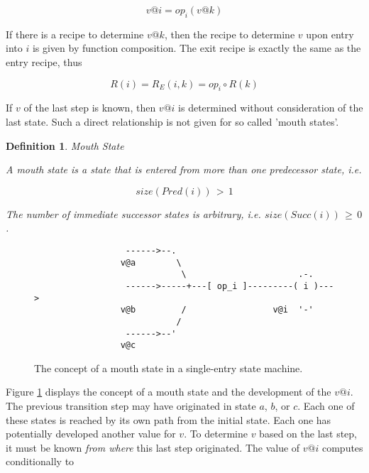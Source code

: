 \documentclass[12pt,a4paper]{scrartcl}
\newtheorem{definition}{Definition}
\begin{document}
\begin{equation} \label{eq:composition}
            v @ i = op_i(v @ k)                                         
\end{equation}

If there is a recipe to determine $v@k$, then the recipe
to determine $v$ upon entry into $i$ is given by function composition. 
The exit recipe is exactly the same as the entry recipe, thus

\begin{equation} \label{eq:composition}
    R(i) = R_E(i,k) = op_i \circ R(k)
\end{equation}

If $v$ of the last step is known, then $v@i$ is determined without
consideration of the last state.  Such a direct relationship is not given for
so called 'mouth states'.

\begin{definition} Mouth State

    A mouth state is a state that is entered from more than one predecessor
    state, i.e.

    \begin{equation}
                               size(Pred(i))\,>\,1
    \end{equation}

    The number of immediate successor states is arbitrary, i.e.
    $size(Succ(i))\,\ge\,0$.

\end{definition}
    
\begin{figure}[htbp] \leavevmode \label{fig:mouth-state}
\begin{verbatim}
                  ------>--.  
                 v@a        \ 
                             \                      .-.
                  ------>-----+---[ op_i ]---------( i )---> 
                 v@b         /                 v@i  '-'
                            /
                  ------>--'
                 v@c 

\end{verbatim}
\caption{The concept of a mouth state in a single-entry state machine.}
\end{figure}

Figure \ref{fig:mouth-state} displays the concept of a mouth state and the
development of the $v@i$. The previous transition step may have originated in
state $a$, $b$, or $c$. Each one of these states is reached by its own path from
the initial state. Each one has potentially developed another value for $v$. 
To determine $v$ based on the last step, it must be known \textit{from where}
this last step originated. The value of $v@i$ computes conditionally to
\end{document}

